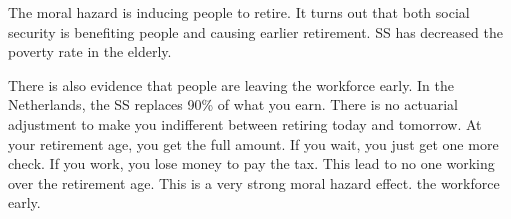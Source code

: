 \documentclass{article}
\begin{document}
The moral hazard is inducing people to retire. It turns out that both social
security is benefiting people and causing earlier retirement. SS has decreased
the poverty rate in the elderly. 

There is also evidence that people are leaving the workforce early. In the
Netherlands, the SS replaces 90\% of what you earn. There is no actuarial
adjustment to make you indifferent between retiring today and tomorrow. At your
retirement age, you get the full amount. If you wait, you just get one more
check. If you work, you lose money to pay the tax. This lead to no one working
over the retirement age. This is a very strong moral hazard effect. 
the workforce early.
\end{document}
